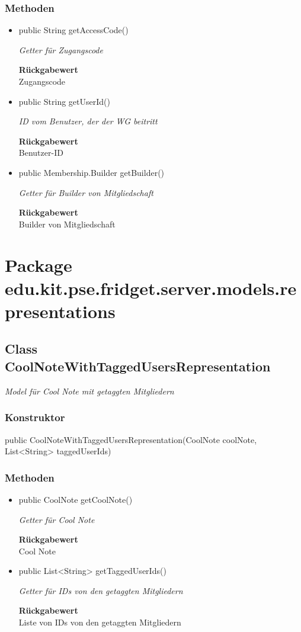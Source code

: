 \documentclass[a4paper]{scrreprt}
\begin{document}
    \subsubsection{Methoden}
    \begin{itemize}
    	\item{public String getAccessCode()}
    	
    	\textit{Getter für Zugangscode}
    	
    	
    	
    	\textbf{Rückgabewert} \\
    	Zugangscode        \item{public String getUserId()}
    	
    	\textit{ID vom Benutzer, der der WG beitritt}
    	
    	
    	
    	\textbf{Rückgabewert} \\
    	Benutzer-ID        \item{public Membership.Builder getBuilder()}
    	
    	\textit{Getter für Builder von Mitgliedschaft}
    	
    	
    	
    	\textbf{Rückgabewert} \\
    	Builder von Mitgliedschaft
    \end{itemize}
    \section{Package edu.kit.pse.fridget.server.models.representations}
    \subsection{Class CoolNoteWithTaggedUsersRepresentation}
    \textit{Model für Cool Note mit getaggten Mitgliedern}
    \subsubsection{Konstruktor}
    public CoolNoteWithTaggedUsersRepresentation(CoolNote coolNote, List<String> taggedUserIds)
    \subsubsection{Methoden}
    \begin{itemize}
    	\item{public CoolNote getCoolNote()}
    	
    	\textit{Getter für Cool Note}
    	
    	
    	
    	\textbf{Rückgabewert} \\
    	Cool Note        \item{public List<String> getTaggedUserIds()}
    	
    	\textit{Getter für IDs von den getaggten Mitgliedern}
    	
    	
    	
    	\textbf{Rückgabewert} \\
    	Liste von IDs von den getaggten Mitgliedern
    \end{itemize}
\end{document}
